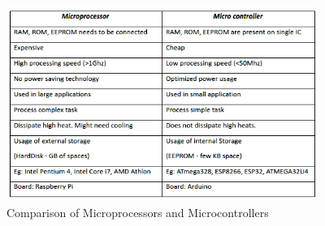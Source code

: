 \begin{figure}
    \centering
    \includegraphics[width=4in]{Chapters/images/ardtab2.png}
    \caption{Comparison of Microprocessors and Microcontrollers}
    \label{fig:my_label}
\end{figure}

